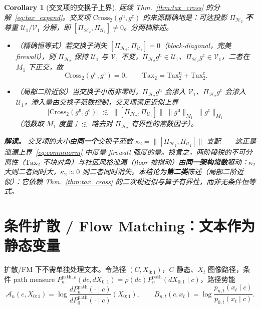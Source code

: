 \documentclass[11pt,a4paper]{article}
\newtheorem{corollary}[theorem]{Corollary}
\newcommand{\cH}{\mathcal{H}}
\newcommand{\cU}{\mathcal{U}}
\newcommand{\cV}{\mathcal{V}}
\newcommand{\cA}{\mathcal{A}}
\newcommand{\ProjectOp}{\Pi}
\newcommand{\uu}{\mathrm{u}}
\newcommand{\cc}{\mathrm{c}}
\begin{document}
\begin{corollary}[交叉项的交换子上界]\label{cor:tax_cross_bound}
延续 Thm.~\ref{thm:tax_cross} 的分解~\eqref{eq:tax_expand}。交叉项 $\mathrm{Cross}_2(g^{\uu},g^{\cc})$ 的来源精确地是：可达投影 $\ProjectOp_{\cH_2}$ \textbf{不}尊重 $\cU_1/\cV_1$ 分解，即 $[\ProjectOp_{\cH_2},\ProjectOp_{\cU_1}]\neq 0$。分两档陈述。
\begin{itemize}
\item（精确恒等式）若交换子消失 $[\ProjectOp_{\cH_2},\ProjectOp_{\cU_1}]=0$（block-diagonal，完美 firewall），则 $\ProjectOp_{\cH_2}$ 保持 $\cU_1$ 与 $\cV_1$ 不变，$\ProjectOp_{\cH_2}g^{\uu}\in\cU_1$、$\ProjectOp_{\cH_2}g^{\cc}\in\cV_1$，二者在 $M_1$ 下正交，故
\[
\mathrm{Cross}_2(g^{\uu},g^{\cc})=0,\qquad \text{Tax}_2=\text{Tax}_2^{\uu}+\text{Tax}_2^{\cc}.
\]
\item（局部二阶近似）当交换子小而非零时，$\ProjectOp_{\cH_2}g^{\uu}$ 会渗入 $\cV_1$、$\ProjectOp_{\cH_2}g^{\cc}$ 会渗入 $\cU_1$，渗入量由交换子范数控制，交叉项满足近似上界
\begin{equation}\label{eq:tax_cross_bound}
\boxed{
\bigl|\mathrm{Cross}_2(g^{\uu},g^{\cc})\bigr| \;\lesssim\; \bigl\|[\ProjectOp_{\cH_2},\ProjectOp_{\cU_1}]\bigr\|\;\|g^{\uu}\|_{M_1}\;\|g^{\cc}\|_{M_1}
}
\end{equation}
（范数取 $M_1$ 度量；$\lesssim$ 略去对 $\ProjectOp_{\cH_2}$ 有界性的常数因子）。
\end{itemize}
\textbf{解读。} 交叉项的大小由\textbf{同一个}交换子范数 $\kappa_2=\|[\ProjectOp_{\cH_2},\ProjectOp_{\cU_1}]\|$ 支配——这正是泄漏上界~\eqref{eq:commnorm} 中度量 firewall 强度的量。换言之，两阶段税的不可分离性（$\text{Tax}_2$ 不块对角）与社区风格泄漏（floor 被搅动）由\textbf{同一架构常数}驱动：$\kappa_2$ 大则二者同时大，$\kappa_2\approx0$ 则二者同时消失。本结论为\textbf{第二类}陈述（局部二阶近似）：它依赖 Thm.~\ref{thm:tax_cross} 的二次税近似与算子有界性，而非无条件恒等式。
\end{corollary}

\section{条件扩散 / Flow Matching：文本作为静态变量}
\label{sec:cond_fm}

扩散/FM 下不需单独处理文本。令路径 $(C,X_{0:1})$，$C$ 静态、$X_t$ 图像路径，条件 path measure $P_n^{\mathrm{path},\rho}(dc,dX_{0:1})=\rho(dc)P_n^{\mathrm{path}}(dX_{0:1}\mid c)$，路径势能
\begin{equation}\label{eq:path_potential}
\cA_n(c,X_{0:1}) = \log\frac{dP_n^{\mathrm{path}}(\cdot\mid c)}{dP_0^{\mathrm{path}}(\cdot\mid c)}(X_{0:1}),\qquad B_{n,t}(c,x_t)=\log\frac{p_{n,t}(x_t\mid c)}{p_{0,t}(x_t\mid c)}.
\end{equation}
\end{document}
